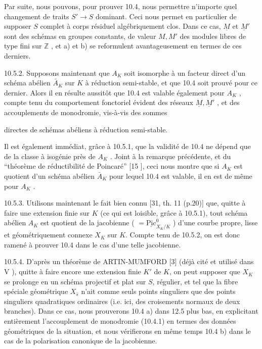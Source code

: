 Par suite, nous pouvons, pour prouver 10.4, nous permettre n'importe quel changement de traits $S' \longrightarrow S$ dominant. Ceci nous permet en particulier de supposer $S$ complet à corps résiduel algébriquement clos. Dans ce cas, $\underline{M}$ et $\underline{M}'$ sont des schémas en groupes constants, de valeur $M,M'$ des modules libres de type fini sur $\mathbb{Z}$ , et a) et b) se reformulent avantageusement en termes de ces derniers.

10.5.2. Supposons maintenant que $A_K$ soit isomorphe à un facteur direct d'un schéma abélien $\bar{A}_K$ sur $K$ à réduction semi-stable, et que 10.4 soit prouvé pour ce dernier. Alors il en résulte aussitôt que 10.4 est valable également pour $A_K$ , compte tenu du comportement fonctoriel évident des réseaux $\underline{M},\underline{M}'$ , et des accouplements de monodromie, vis-à-vis des sommes



directes de schémas abéliens à réduction semi-stable.

Il est également immédiat, grâce à 10.5.1, que la validité de 10.4 ne dépend que de la classe à isogénie près de $A_K$ . Joint à la remarque précédente, et du ``théorème de réductibilité de Poincaré'' [15 \qquad ], ceci nous montre que si $A_K$ est quotient d'un schéma abélien $\bar{A}_K$ pour lequel 10.4 est valable, il en est de même pour $A_K$ .

10.5.3. Utilisons maintenant le fait bien connu [31, th. 11 (p.20)] que, quitte à faire une extension finie sur $K$ (ce qui est loisible, grâce à 10.5.1), tout schéma abélien $A_K$ est quotient de la jacobienne ( $= \underline{\mathrm{Pic}}^{0}_{X_K/K}$ ) d'une courbe propre, lisse et géométriquement connexe $X_K$ sur $K$. Compte tenu de 10.5.2, on est donc ramené à prouver 10.4 dans le cas d'une telle jacobienne.

10.5.4. D'après un théorème de ARTIN-MUMFORD [3] (déjà cité et utilisé dans V \qquad ), quitte à faire encore une extension finie $K'$ de $K$, on peut supposer que $X_K$ se prolonge en un schéma projectif et plat sur $S$, régulier, et tel que la fibre spéciale géométrique $X_{\bar{s}}$ n'ait comme seuls points singuliers que des points singuliers quadratiques ordinaires (i.e. ici, des croisements normaux de deux branches). Dans ce cas, nous prouverons 10.4 a) dans 12.5 plus bas, en explicitant entièrement l'accouplement de monodromie (10.4.1) en termes des données géométriques de la situation, et nous vérifierons en même temps 10.4 b) dans le cas de la polarisation canonique de la jacobienne.



